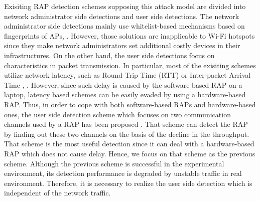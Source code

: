 \documentclass[paper]{ieice}
\begin{document}
Exisiting RAP detection schemes supposing this attack model are divided into network administrator side detections and user side detections.
The network administrator side detections mainly use whitelist-based mechanisms based on fingerprints of APs\cite{prapd}, \cite{clockskew}.
However, those solutions are inapplicable to Wi-Fi hotspots since they make network administrators set additional costly devices in their infrastructures.
On the other hand, the user side detections focus on characteristics in packet transmission.
In particular, most of the exisiting schemes utilize network latency, such as Round-Trip Time (RTT) or Inter-packet Arrival Time \cite{rtt}, \cite{iat}.
However, since such delay is caused by the software-based RAP on a laptop, latency based schemes can be easily evaded by using a hardware-based RAP.
Thus, in order to cope with both software-based RAPs and hardware-based ones, the user side detection scheme which focuses on two communication channels used by a RAP has been proposed \cite{previous}.
That scheme can detect the RAP by finding out these two channels on the basis of the decline in the throughput.
That scheme is the most useful detection since it can deal with a hardware-based RAP which does not cause delay.
Hence, we focus on that scheme \cite{previous} as the previous scheme.
Although the previous scheme is successful in the experimental environment, its detection performance is degraded by unstable traffic in real environment.
Therefore, it is necessary to realize the user side detection which is independent of the network traffic.
\end{document}
